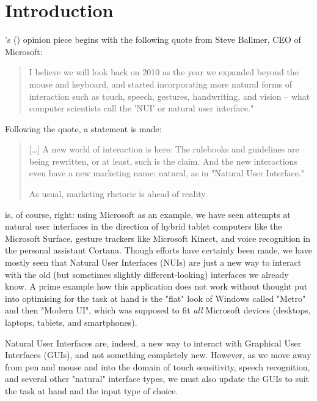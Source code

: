 \section{Introduction}

\citeauthor{norman:natural-user-interfaces-are-not-natural:2010}'s (\citeyear{norman:natural-user-interfaces-are-not-natural:2010}) opinion piece  begins with the following quote from Steve Ballmer, CEO of Microsoft:

\begin{quote}
I believe we will look back on 2010 as the year we expanded beyond the mouse and keyboard, and started incorporating more natural forms of interaction such as touch, speech, gestures, handwriting, and vision -- what computer scientists call the 'NUI' or natural user interface."
\end{quote}

Following the quote, a statement is made:

\begin{quotation}
[\dots] A new world of interaction is here: The rulebooks and guidelines are being rewritten, or at least, such is the claim. And the new interactions even have a new marketing name: natural, as in "Natural User Interface."

As usual, marketing rhetoric is ahead of reality.    
\end{quotation}

\citeauthor{norman:natural-user-interfaces-are-not-natural:2010} is, of course, right: using Microsoft as an example, we have seen attempts at natural user interfaces in the direction of hybrid tablet computers like the Microsoft Surface, gesture trackers like Microsoft Kinect, and voice recognition in the personal assistant Cortana. Though efforts have certainly been made, we have mostly seen that Natural User Interfaces (NUIs) are just a new way to interact with the old (but sometimes slightly different-looking) interfaces we already know. A prime example how this application does not work without thought put into optimising for the task at hand is the "flat" look of Windows called "Metro" and then "Modern UI", which was supposed to fit \textit{all} Microsoft devices (desktops, laptops, tablets, and smartphones).

Natural User Interfaces are, indeed, a new way to interact with Graphical User Interfaces (GUIs), and not something completely new. However, as we move away from pen and mouse and into the domain of touch sensitivity, speech recognition, and several other "natural" interface types, we must also update the GUIs to suit the task at hand and the input type of choice.

